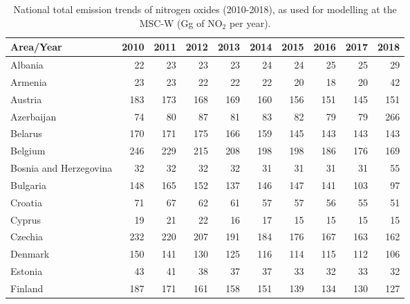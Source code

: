  \begin{table}
 \caption{National total emission trends of nitrogen oxides (2010-2018), as used for modelling at the MSC-W (Gg of NO$_2$ per year).}
 
 \vspace{15pt}
 
 \scriptsize
 \centering
 \begin{tabular}{|l|r|r|r|r|r|r|r|r|r|}
 \hline
                     Area/Year&   2010&   2011&   2012&   2013&   2014&   2015&   2016&   2017&   2018\\\hline\hline
                       Albania&     22&     23&     23&     23&     24&     24&     25&     25&     29\\\hline
                       Armenia&     23&     23&     22&     22&     22&     20&     18&     20&     42\\\hline
                       Austria&    183&    173&    168&    169&    160&    156&    151&    145&    151\\\hline
                    Azerbaijan&     74&     80&     87&     81&     83&     82&     79&     79&    266\\\hline
                       Belarus&    170&    171&    175&    166&    159&    145&    143&    143&    143\\\hline
                       Belgium&    246&    229&    215&    208&    198&    198&    186&    176&    169\\\hline
        Bosnia and Herzegovina&     32&     32&     32&     32&     31&     31&     31&     31&     55\\\hline
                      Bulgaria&    148&    165&    152&    137&    146&    147&    141&    103&     97\\\hline
                       Croatia&     71&     67&     62&     61&     57&     57&     56&     55&     51\\\hline
                        Cyprus&     19&     21&     22&     16&     17&     15&     15&     15&     15\\\hline
                       Czechia&    232&    220&    207&    191&    184&    176&    167&    163&    162\\\hline
                       Denmark&    150&    141&    130&    125&    116&    114&    115&    112&    106\\\hline
                       Estonia&     43&     41&     38&     37&     37&     33&     32&     33&     32\\\hline
                       Finland&    187&    171&    161&    158&    151&    139&    134&    130&    127\\\hline

\end{tabular}
\end{table}
